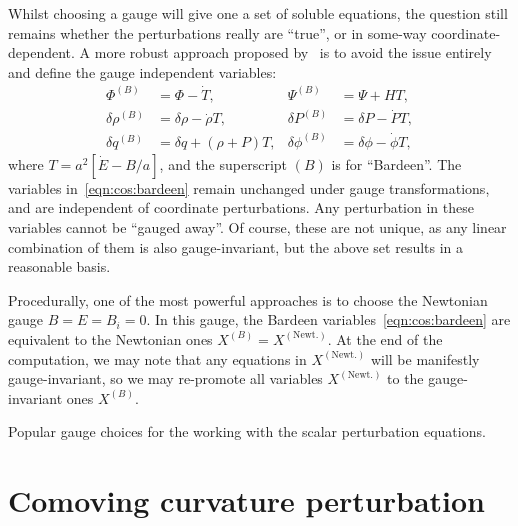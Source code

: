 Whilst choosing a gauge will give one a set of soluble equations, the question still remains whether the perturbations really are ``true'', or in some-way coordinate-dependent. A more robust approach proposed by~\cite{Bardeen_GI} is to avoid the issue entirely and define the gauge independent variables:
\begin{align}
  \Phi^{(B)} &=  \Phi - \dot{T}, &
  \Psi^{(B)} &=  \Psi + HT \nonumber, \\
  \delta\rho^{(B)} &= \delta\rho - \dot{\rho}T, &
  \delta P^{(B)} &= \delta P - \dot{P}T  \nonumber,\\
  \delta q^{(B)} &= \delta q + (\rho + P)T, &
  \delta \phi^{(B)} &= \delta \phi - \dot{\phi}T, 
  \label{eqn:cos:bardeen}
\end{align}
where \(T = a^2[\dot{E}-B/a]\), and the superscript \((B)\) is for ``Bardeen''. The variables in~\eqref{eqn:cos:bardeen} remain unchanged under gauge transformations, and are independent of coordinate perturbations. Any perturbation in these variables cannot be ``gauged away''. Of course, these are not unique, as any linear combination of them is also gauge-invariant, but the above set results in a reasonable basis. 

Procedurally, one of  the most powerful approaches is to choose the Newtonian gauge \({B=E=B_i=0}\). In this gauge, the Bardeen variables~\eqref{eqn:cos:bardeen} are equivalent to the Newtonian ones \(X^{(B)}=X^{(\text{Newt.})}\). At the end of the computation, we may note that any equations in \(X^{(\text{Newt.})}\) will be manifestly gauge-invariant, so we may re-promote all variables \(X^{(\text{Newt.})}\) to the gauge-invariant ones \(X^{(B)}\).


\begin{table}[tp]
  \centering
  
\caption{Popular gauge choices for the working with the scalar perturbation equations.}\label{tab:cos:gauge_choice}
\end{table}

\section{Comoving curvature perturbation}
\label{cos:sec:comoving_curvature_perturbation}

